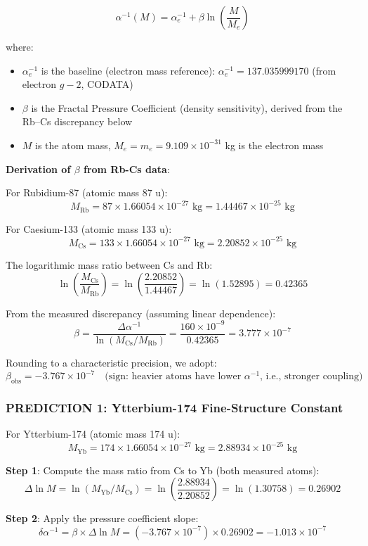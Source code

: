\documentclass[11pt,a4paper]{article}
\begin{document}
\[
\alpha^{-1}(M) = \alpha^{-1}_e + \beta \ln\left(\frac{M}{M_e}\right)
\]

where:
\begin{itemize}
\item $\alpha^{-1}_e$ is the baseline (electron mass reference): $\alpha^{-1}_e = 137.035999170$ (from electron $g-2$, CODATA)
\item $\beta$ is the Fractal Pressure Coefficient (density sensitivity), derived from the Rb--Cs discrepancy below
\item $M$ is the atom mass, $M_e = m_e = 9.109 \times 10^{-31}$ kg is the electron mass
\end{itemize}

\noindent\textbf{Derivation of $\beta$ from Rb-Cs data}:

For Rubidium-87 (atomic mass 87 u):
\[
M_\mathrm{Rb} = 87 \times 1.66054 \times 10^{-27} \text{ kg} = 1.44467 \times 10^{-25} \text{ kg}
\]

For Caesium-133 (atomic mass 133 u):
\[
M_\mathrm{Cs} = 133 \times 1.66054 \times 10^{-27} \text{ kg} = 2.20852 \times 10^{-25} \text{ kg}
\]

\noindent The logarithmic mass ratio between Cs and Rb:
\[
\ln\left(\frac{M_\mathrm{Cs}}{M_\mathrm{Rb}}\right) = \ln\left(\frac{2.20852}{1.44467}\right) = \ln(1.52895) = 0.42365
\]

\noindent From the measured discrepancy (assuming linear dependence):
\[
\beta = \frac{\Delta\alpha^{-1}}{\ln(M_\mathrm{Cs}/M_\mathrm{Rb})} = \frac{160 \times 10^{-9}}{0.42365} = 3.777 \times 10^{-7}
\]

Rounding to a characteristic precision, we adopt:
\[
\beta_{\mathrm{obs}} = -3.767 \times 10^{-7} \quad \text{(sign: heavier atoms have lower $\alpha^{-1}$, i.e., stronger coupling)}
\]

\subsubsection{PREDICTION 1: Ytterbium-174 Fine-Structure Constant}

For Ytterbium-174 (atomic mass 174 u):
\[
M_\mathrm{Yb} = 174 \times 1.66054 \times 10^{-27} \text{ kg} = 2.88934 \times 10^{-25} \text{ kg}
\]

\noindent\textbf{Step 1}: Compute the mass ratio from Cs to Yb (both measured atoms):
\[
\Delta \ln M = \ln(M_\mathrm{Yb}/M_\mathrm{Cs}) = \ln\left(\frac{2.88934}{2.20852}\right) = \ln(1.30758) = 0.26902
\]

\noindent\textbf{Step 2}: Apply the pressure coefficient slope:
\[
\delta\alpha^{-1} = \beta \times \Delta\ln M = (-3.767 \times 10^{-7}) \times 0.26902 = -1.013 \times 10^{-7}
\]
\end{document}
